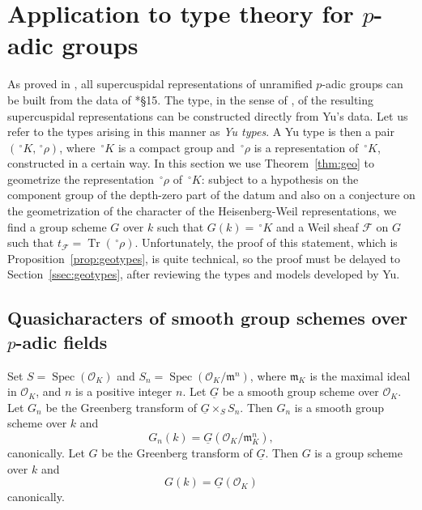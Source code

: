 \documentclass[10pt]{amsart}
\theoremstyle{plain}
\theoremstyle{definition}
\newcommand{\OK}{\mathcal{O}_K}
\newcommand{\Fq}{k}
\DeclareMathOperator{\trace}{Tr}
\newcommand{\Spec}[1]{{\operatorname{Spec}(#1)}}
\newcommand{\trFrob}[1]{t_{#1}}
\newcommand{\cs}[1]{{\mathcal{#1}}}
\begin{document}
\section{Application to type theory for \texorpdfstring{$p$}{p}-adic groups}\label{sec:types}

\newcommand{\red}{^{\operatorname{red}}}
\newcommand{\Sp}{{\operatorname{Sp}}}

As proved in \cite{kim:07a}, all supercuspidal representations of unramified $p$-adic groups can be built from the data of \cite{yu:01a}*{\S 15}.
The type, in the sense of \cite{bushnell-kutzko:98a}, of the resulting supercuspidal representations can be constructed directly from Yu's data. 
Let us refer to the types arising in this manner as {\it Yu types}.
%
A Yu type is then a pair $(\,^\circ K,\,^\circ \rho)$, where $\,^\circ K$ is a compact group and $\,^\circ \rho$ is a representation of $\,^\circ K$, constructed in a certain way. 
%
In this section we use Theorem~\ref{thm:geo} to geometrize the representation $\,^\circ \rho$ of $\,^\circ K$: subject to a hypothesis on the component group of the depth-zero part of the datum and also on a conjecture on the geometrization of the character of the Heisenberg-Weil representations, we find a group scheme $G$ over $\Fq$ such that $G(\Fq) = \,^\circ K$ and a Weil sheaf $\mathcal{F}$ on $G$ such that $\trFrob{\cs{F}} = \trace(\,^\circ \rho)$.
Unfortunately, the proof of this statement,  which is Proposition~\ref{prop:geotypes}, is quite technical, so the proof must be delayed to Section~\ref{ssec:geotypes}, after reviewing the types and models developed by Yu.

\subsection{Quasicharacters of smooth group schemes over $p$-adic fields}


Set $S = \Spec{\OK}$ and $S_n = \Spec{\OK/\mathfrak{m}^n}$, where $\mathfrak{m}_K$ is the maximal ideal in $\OK$, and $n$ is a positive integer $n$.
Let $\underline{G}$ be a smooth group scheme over $\OK$.
Let $G_n$ be the Greenberg transform of $\underline{G} \times_{S} S_n$.
Then $G_n$ is a smooth group scheme over $\Fq$ and 
\[
G_n(\Fq) = \underline{G}(\OK/\mathfrak{m}_K^n),
\]
canonically.
%
Let $G$ be the Greenberg transform of $\underline{G}$.
Then $G$ is a group scheme over $\Fq$ and 
\[
G(\Fq) = \underline{G}(\OK)
\]
canonically.
\end{document}
